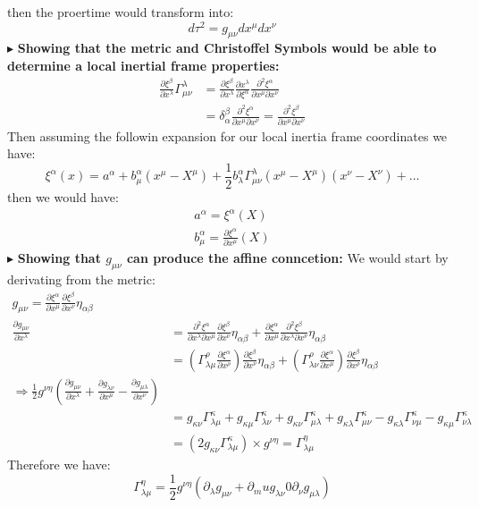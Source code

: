 \documentclass[10pt,a4paper]{article}
\newcommand{\newpoint}[1]{\indent$\blacktriangleright$ \textbf{#1}}
\begin{document}
     then the proertime would transform into:
     \begin{equation}
          d\tau^2 = g_{\mu\nu} dx^\mu dx^\nu 
     \end{equation}
     \newpoint{Showing that the metric and Christoffel Symbols would be able to determine a local inertial frame properties:}
     \begin{align}
         \frac{\partial \xi^\beta}{\partial x^{\lambda}} \Gamma^\lambda_{\mu\nu} &= \frac{\partial \xi^\beta}{\partial x^\lambda}\frac{\partial x^\lambda}{\partial \xi^\alpha} \frac{\partial^2\xi^\alpha}{\partial x^\mu\partial x^\nu}
          \\
          &=\delta_\alpha^\beta \frac{\partial^2\xi^\alpha}{\partial x^\mu\partial x^\nu} = \frac{\partial^2\xi^\beta}{\partial x^\mu \partial x^\nu}
     \end{align}
     Then assuming the followin expansion for our local inertia frame coordinates we have:
     \begin{equation}
          \xi^\alpha (x) = a^\alpha + b_\mu^\alpha ( x^\mu - X^\mu) + \frac12 b_\lambda^\alpha \Gamma^\lambda_{\mu\nu} (x^\mu - X^\mu)(x^\nu - X^\nu) + \dots 
     \end{equation}
     then we would have:
     \begin{align*}
          a^\alpha  = \xi^\alpha (X)
          \\
          b^\alpha_\mu = \frac{\partial \xi^\alpha}{\partial x^\mu}(X)
     \end{align*}
     \newpoint{Showing that $g_{\mu\nu}$ can produce the affine conncetion: } We would start by derivating from the metric:
     \begin{align}
          g_{\mu\nu} = \frac{\partial \xi^\alpha}{\partial x^\mu}\frac{\partial \xi^\beta}{\partial x^\nu}\eta_{\alpha \beta}
          \\
          \frac{\partial g_{\mu\nu}}{\partial x^\lambda} &= \frac{\partial^2 \xi^\alpha}{\partial x^\lambda \partial x^\mu}\frac{\partial \xi^\beta}{\partial x^\nu}\eta_{\alpha\beta} + \frac{\partial \xi^\alpha}{\partial x^\mu}\frac{\partial^2\xi^\beta}{\partial x^\lambda\partial x^\nu}\eta_{\alpha\beta}\\
          &= \left(\Gamma^\rho_{\lambda\mu} \frac{\partial \xi^\alpha}{\partial x^\rho}\right)\frac{\partial \xi^\beta}{\partial x^\nu}\eta_{\alpha\beta} + \left(\Gamma^\rho_{\lambda\nu} \frac{\partial \xi^\alpha}{\partial x^\mu}\right)\frac{\partial \xi^\beta}{\partial x^\rho} \eta_{\alpha\beta} \\ 
          \Rightarrow \frac12 g^{\nu\eta}\left(\frac{\partial g_{\mu\nu}}{\partial x^\lambda} + \frac{\partial g_{\lambda\nu}}{\partial x^\mu}  - \frac{\partial g_{\mu\lambda}}{\partial x^\nu}\right)
          \\
          &= g_{\kappa\nu}\Gamma^\kappa_{\lambda\mu} + g_{\kappa\mu}\Gamma^\kappa_{\lambda\nu} + g_{\kappa\nu}\Gamma^\kappa_{\mu\lambda} + g_{\kappa\lambda}\Gamma^\kappa_{\mu\nu} - g_{\kappa\lambda}\Gamma^\kappa_{\nu\mu} - g_{\kappa\mu}\Gamma^\kappa_{\nu\lambda}\\
          &= (2g_{\kappa\nu}\Gamma^\kappa_{\lambda\mu}) \times g^{\nu\eta} = \Gamma^\eta_{\lambda\mu}
     \end{align}
     Therefore we have:
     \begin{equation}
          \Gamma^{\eta}_{\lambda\mu} = \frac12 g^{\nu\eta} \left( \partial_\lambda g_{\mu\nu} + \partial_mu g_{\lambda \nu} 0 \partial_\nu g_{\mu\lambda}\right)
     \end{equation}
\end{document}
